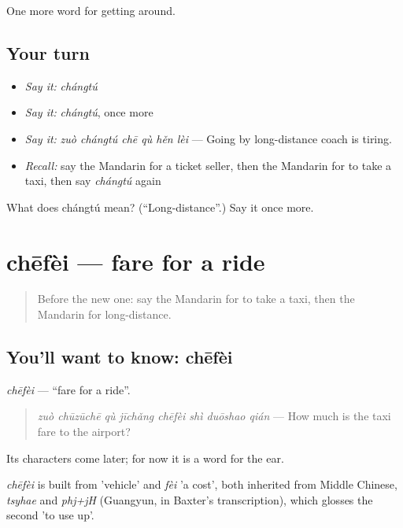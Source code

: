 \begin{grammarlens}[title={What you've built}]
One more word for getting around.
\end{grammarlens}

\subsection*{Your turn}
\begin{itemize}
\raggedright
  \item \emph{Say it:} \emph{chángtú}
  \item \emph{Say it:} \emph{chángtú}, once more
  \item \emph{Say it:} \emph{zuò chángtú chē qù hěn lèi} — Going by long-distance coach is tiring.
  \item \emph{Recall:} say the Mandarin for a ticket seller, then the Mandarin for to take a taxi, then say \emph{chángtú} again
\end{itemize}

\begin{tcolorbox}[breakable,colback=teal!4,colframe=teal!35!black,title={Before you move on}]
What does chángtú mean? (\textquotedblleft{}Long-distance\textquotedblright{}.) Say it once more.
\end{tcolorbox}
\section[chēfèi]{chēfèi — fare for a ride}

\label{lesson:ZH-C410-chefei}



\begin{quote}
Before the new one: say the Mandarin for to take a taxi, then the Mandarin for long-distance.
\end{quote}

\subsection*{You'll want to know: chēfèi}
\emph{chēfèi} — \textquotedblleft{}fare for a ride\textquotedblright{}.

\begin{quote}
\emph{zuò chūzūchē qù jīchǎng chēfèi shì duōshao qián} — How much is the taxi fare to the airport?
\end{quote}

Its characters come later; for now it is a word for the ear.

\begin{cousinweb}
\emph{chēfèi} is built from  'vehicle' and \emph{fèi} 'a cost', both inherited from Middle Chinese, \emph{tsyhae} and \emph{phj+jH} (Guangyun, in Baxter's transcription), which glosses the second 'to use up'.
\end{cousinweb}

